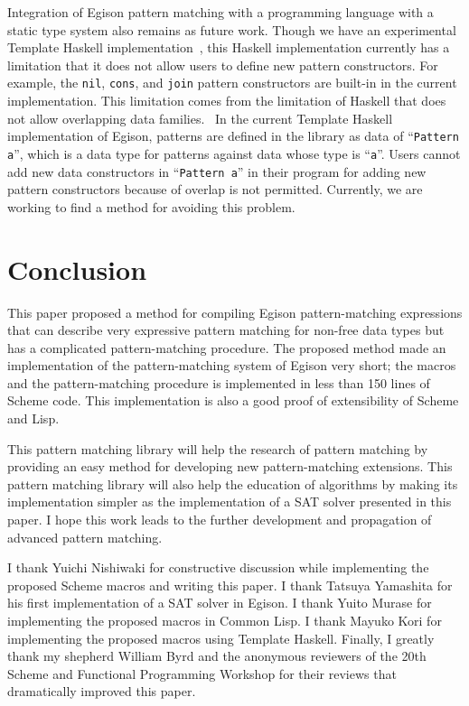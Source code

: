\documentclass[acmlarge]{acmart}
\newcommand{\new}[1]{\textcolor{blue}{#1}}
\begin{document}
Integration of Egison pattern matching with a programming language with a static type system also remains as future work.
Though we have an experimental Template Haskell implementation~\cite{egisonHaskell}, this Haskell implementation currently has a limitation that it does not allow users to define new pattern constructors.
For example, the \lstinline{nil}, \lstinline{cons}, and \lstinline{join} pattern constructors are built-in in the current implementation.
This limitation comes from the limitation of Haskell that does not allow overlapping data families.~\cite{ghcMan}
In the current Template Haskell implementation of Egison, patterns are defined in the library as data of ``\lstinline{Pattern a}'', which is a data type for patterns against data whose type is ``\lstinline{a}''.
Users cannot add new data constructors in ``\lstinline{Pattern a}'' in their program for adding new pattern constructors because of overlap is not permitted.
Currently, we are working to find a method for avoiding this problem.


\section{Conclusion}\label{conclusion}

This paper proposed a method for compiling Egison pattern-matching expressions that can describe very expressive pattern matching for non-free data types but has a complicated pattern-matching procedure.
The proposed method made an implementation of the pattern-matching system of Egison very short; the macros and the pattern-matching procedure is implemented in less than 150 lines of Scheme code.
This implementation is also a good proof of extensibility of Scheme and Lisp.

This pattern matching library will help the research of pattern matching by providing an easy method for developing new pattern-matching extensions.
This pattern matching library will also help the education of algorithms by making its implementation simpler as the implementation of a SAT solver presented in this paper.
I hope this work leads to the further development and propagation of advanced pattern matching.

\begin{acks}
  I thank Yuichi Nishiwaki for constructive discussion while implementing the proposed Scheme macros and writing this paper.
  I thank Tatsuya Yamashita for his first implementation of a SAT solver in Egison.
  I thank Yuito Murase for implementing the proposed macros in Common Lisp.
  I thank Mayuko Kori for implementing the proposed macros using Template Haskell.
  Finally, I greatly thank my shepherd William Byrd and the anonymous reviewers of the 20th Scheme and Functional Programming Workshop for their reviews that dramatically improved this paper.
\end{acks}
\end{document}

